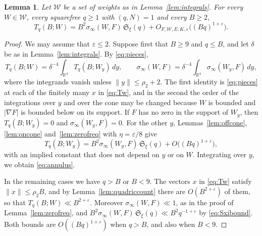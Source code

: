 \documentclass[11pt]{amsart}
\numberwithin{equation}{section}
\numberwithin{figure}{section}
\newtheorem{lemma}{Lemma}[section]
\theoremstyle{definition}
\newcommand{\R}{\mathbb{R}}
\renewcommand{\S}{\mathfrak{S}}
\newcommand{\eps}{\varepsilon}
\newcommand{\abs}[1]{\lvert #1\rvert}
\begin{document}
\begin{lemma}\label{lem:annulus}
Let $\mathcal W$ be a set of weights as in
Lemma~\ref{lem:integrals}. For every $W\in\mathcal W$, every
squarefree $q\ge1$ with $(q,N)=1$ and every $B\ge2$,
\begin{equation}\label{eq:annulus}
 T_q(B;W)=B^2\sigma_\infty(W,F)\,\S_\xi(q)
 +O_{F,\mathcal W,E,K,\eps}\big((Bq)^{1+\eps}\big).
\end{equation}
\end{lemma}

\begin{proof}
We may assume that $\eps\le2$. Suppose first that $B\ge9$ and
$q\le B$, and let $\delta$ be as in Lemma~\ref{lem:integrals}. By
\eqref{eq:pieces},
\[
 T_q(B;W)=\delta^{-4}\int_{\R^4}T_q(B;W_y)\,dy,\qquad
 \sigma_\infty(W,F)=\delta^{-4}\int_{\R^4}\sigma_\infty(W_y,F)\,dy,
\]
where the integrands vanish unless $\lVert y\rVert\le\rho_2+2$. The
first identity is \eqref{eq:pieces} at each of the finitely many $x$
in \eqref{eq:Tw}, and in the second the order of the integrations
over $y$ and over the cone may be changed because $W$ is bounded and
$\abs{\nabla F}$ is bounded below on its support. If $F$ has no zero
in the support of $W_y$, then $T_q(B;W_y)=0$ and
$\sigma_\infty(W_y,F)=0$. For the other $y$,
Lemmas~\ref{lem:offcone}, \ref{lem:oncone} and~\ref{lem:zerofreq}
with $\eta=\eps/8$ give
\[
 T_q(B;W_y)=B^2\sigma_\infty(W_y,F)\,\S_\xi(q)+O\big((Bq)^{1+\eps}\big),
\]
with an implied constant that does not depend on $y$ or on $W$.
Integrating over $y$, we obtain \eqref{eq:annulus}.

In the remaining cases we have $q>B$ or $B<9$. The vectors $x$ in
\eqref{eq:Tw} satisfy $\lVert x\rVert\le\rho_2B$, and by
Lemma~\ref{lem:quadriccount} there are $O(B^{2+\eps})$ of them, so
that $T_q(B;W)\ll B^{2+\eps}$. Moreover
$\sigma_\infty(W,F)\ll1$, as in the proof of
Lemma~\ref{lem:zerofreq}, and
$B^2\sigma_\infty(W,F)\,\S_\xi(q)\ll B^2q^{-1+\eps}$ by
\eqref{eq:Sxibound}. Both bounds are $O((Bq)^{1+\eps})$ when $q>B$,
and also when $B<9$.
\end{proof}
\end{document}
